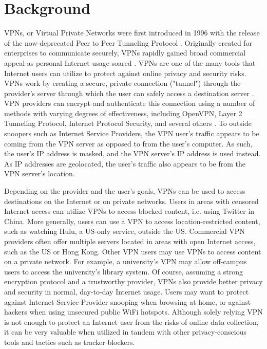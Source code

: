 \section{Background}\label{sec:background}
VPNs, or Virtual Private Networks were first introduced in 1996 with the release of the now-deprecated Peer
to Peer Tunneling Protocol \cite{hirst_26}. Originally created for enterprises to
communicate securely, VPNs rapidly gained broad commercial appeal as personal
Internet usage soared \cite{hirst_26}. VPNs are one of the many tools that Internet
users can utilize to protect against online privacy and security risks. VPNs
work by creating a secure, private connection ("tunnel") through the
provider's server through which the user can safely access a destination
server \cite{vaughan-nichols_25}. VPN providers can encrypt and authenticate this connection using
a number of methods with varying degrees of effectiveness, including OpenVPN,
Layer 2 Tunneling Protocol, Internet Protocol Security, and several others
\cite{vaughan-nichols_25}. To outside snoopers such as Internet Service Providers, the VPN user's
traffic appears to be coming from the VPN server as opposed to from the user's
computer. As such, the user's IP address is masked, and the VPN server's IP
address is used instead. As IP addresses are geolocated, the user's traffic
also appears to be from the VPN server's location.

Depending on the provider and the user's goals, VPNs can be used to access
destinations on the Internet or on private networks. Users in areas with
censored Internet access can utilize VPNs to access blocked content, i.e.
using Twitter in China. More generally, users can use a VPN to access
location-restricted content, such as watching Hulu, a US-only service, outside
the US. Commercial VPN providers often offer multiple servers located in areas
with open Internet access, such as the US or Hong Kong. Other VPN users may
use VPNs to access content on a private network. For example, a
university's VPN may allow off-campus users to access the university's library
system. Of course, assuming a strong encryption protocol and a trustworthy
provider, VPNs also provide better privacy and security in normal, day-to-day
Internet usage. Users may want to protect against Internet Service Provider
snooping when browsing at home, or against hackers when using unsecured public
WiFi hotspots. Although solely relying VPN is not enough to protect an
Internet user from the risks of online data collection, it can be very
valuable when utilized in tandem with other privacy-conscious tools and
tactics such as tracker blockers.


